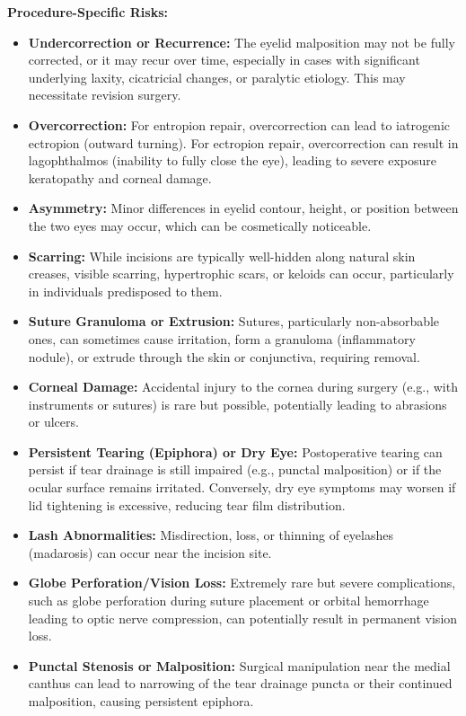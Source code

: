 \textbf{Procedure-Specific Risks:}
\begin{itemize}
  \item \textbf{Undercorrection or Recurrence:} The eyelid malposition may not be fully corrected, or it may recur over time, especially in cases with significant underlying laxity, cicatricial changes, or paralytic etiology. This may necessitate revision surgery.

  \item \textbf{Overcorrection:} For entropion repair, overcorrection can lead to iatrogenic ectropion (outward turning). For ectropion repair, overcorrection can result in lagophthalmos (inability to fully close the eye), leading to severe exposure keratopathy and corneal damage.

  \item \textbf{Asymmetry:} Minor differences in eyelid contour, height, or position between the two eyes may occur, which can be cosmetically noticeable.

  \item \textbf{Scarring:} While incisions are typically well-hidden along natural skin creases, visible scarring, hypertrophic scars, or keloids can occur, particularly in individuals predisposed to them.

  \item \textbf{Suture Granuloma or Extrusion:} Sutures, particularly non-absorbable ones, can sometimes cause irritation, form a granuloma (inflammatory nodule), or extrude through the skin or conjunctiva, requiring removal.

  \item \textbf{Corneal Damage:} Accidental injury to the cornea during surgery (e.g., with instruments or sutures) is rare but possible, potentially leading to abrasions or ulcers.

  \item \textbf{Persistent Tearing (Epiphora) or Dry Eye:} Postoperative tearing can persist if tear drainage is still impaired (e.g., punctal malposition) or if the ocular surface remains irritated. Conversely, dry eye symptoms may worsen if lid tightening is excessive, reducing tear film distribution.

  \item \textbf{Lash Abnormalities:} Misdirection, loss, or thinning of eyelashes (madarosis) can occur near the incision site.

  \item \textbf{Globe Perforation/Vision Loss:} Extremely rare but severe complications, such as globe perforation during suture placement or orbital hemorrhage leading to optic nerve compression, can potentially result in permanent vision loss.

  \item \textbf{Punctal Stenosis or Malposition:} Surgical manipulation near the medial canthus can lead to narrowing of the tear drainage puncta or their continued malposition, causing persistent epiphora.
\end{itemize}


